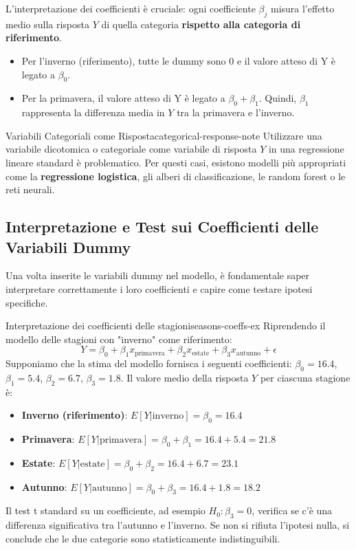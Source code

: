 L'interpretazione dei coefficienti è cruciale: ogni coefficiente \(\beta_j\)
misura l'effetto medio sulla risposta \(Y\) di quella categoria \textbf{rispetto
alla categoria di riferimento}.
\begin{itemize}
    \item Per l'inverno (riferimento), tutte le dummy sono 0 e il valore atteso
    di Y è legato a \(\beta_0\).
    \item Per la primavera, il valore atteso di Y è legato a \(\beta_0 +
    \beta_1\). Quindi, \(\beta_1\) rappresenta la differenza media in \(Y\) tra
    la primavera e l'inverno.
\end{itemize}

\begin{nota}{Variabili Categoriali come Risposta}{categorical-response-note}
Utilizzare una variabile dicotomica o categoriale come variabile di risposta
\(Y\) in una regressione lineare standard è problematico. Per questi casi,
esistono modelli più appropriati come la \textbf{regressione logistica}, gli
alberi di classificazione, le random forest o le reti neurali.
\end{nota}

\subsection{Interpretazione e Test sui Coefficienti delle Variabili Dummy}

Una volta inserite le variabili dummy nel modello, è fondamentale saper
interpretare correttamente i loro coefficienti e capire come testare ipotesi
specifiche.

\begin{esempio}{Interpretazione dei coefficienti delle
stagioni}{seasons-coeffs-ex}
Riprendendo il modello delle stagioni con "inverno" come riferimento:
\[ Y = \beta_0 + \beta_1 x_{\text{primavera}} + \beta_2 x_{\text{estate}} +
\beta_3 x_{\text{autunno}} + \epsilon \]
Supponiamo che la stima del modello fornisca i seguenti coefficienti:
\(\beta_0=16.4\), \(\beta_1=5.4\), \(\beta_2=6.7\), \(\beta_3=1.8\).
Il valore medio della risposta \(Y\) per ciascuna stagione è:
\begin{itemize}
    \item \textbf{Inverno (riferimento)}: \( E[Y | \text{inverno}] = \beta_0 =
    16.4 \)
    \item \textbf{Primavera}: \( E[Y | \text{primavera}] = \beta_0 + \beta_1 =
    16.4 + 5.4 = 21.8 \)
    \item \textbf{Estate}: \( E[Y | \text{estate}] = \beta_0 + \beta_2 = 16.4 +
    6.7 = 23.1 \)
    \item \textbf{Autunno}: \( E[Y | \text{autunno}] = \beta_0 + \beta_3 = 16.4
    + 1.8 = 18.2 \)
\end{itemize}
Il test t standard su un coefficiente, ad esempio \(H_0: \beta_3=0\), verifica
se c'è una differenza significativa tra l'autunno e l'inverno. Se non si
rifiuta l'ipotesi nulla, si conclude che le due categorie sono statisticamente
indistinguibili.
\end{esempio}

